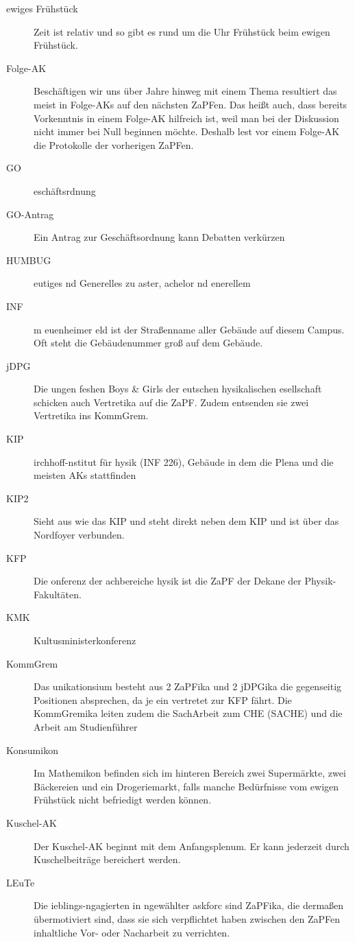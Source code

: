 \begin{description}
	\item[ewiges Frühstück] Zeit ist relativ und so gibt es rund um die Uhr Frühstück beim ewigen Frühstück.
	\item[Folge-AK] Beschäftigen wir uns über Jahre hinweg mit einem Thema resultiert das meist in Folge-AKs auf den nächsten ZaPFen. Das heißt auch, dass bereits Vorkenntnis in einem Folge-AK hilfreich ist, weil man bei der Diskussion nicht immer bei Null beginnen möchte. Deshalb lest vor einem Folge-AK die Protokolle der vorherigen ZaPFen.
	\item[GO] eschäftsrdnung
	\item[GO-Antrag] Ein Antrag zur Geschäftsordnung kann Debatten verkürzen
	\item[HUMBUG] eutiges nd Generelles zu aster, achelor nd enerellem
	\item[INF] m euenheimer eld ist der Straßenname aller Gebäude auf diesem Campus. Oft steht die Gebäudenummer groß auf dem Gebäude.
	\item[jDPG] Die ungen feshen Boys \& Girls der eutschen hysikalischen esellschaft schicken auch Vertretika auf die ZaPF. Zudem entsenden sie zwei Vertretika ins KommGrem.
	\item[KIP] irchhoff-nstitut für hysik (INF 226), Gebäude in dem die Plena und die meisten AKs stattfinden 
	\item[KIP2] Sieht aus wie das KIP und steht direkt neben dem KIP und ist über das Nordfoyer verbunden.
	\item[KFP] Die onferenz der achbereiche hysik ist die ZaPF der Dekane der Physik-Fakultäten.
	\item[KMK] Kultusministerkonferenz
	\item[KommGrem] Das unikationsium besteht aus 2 ZaPFika und 2 jDPGika die gegenseitig Positionen absprechen, da je ein vertretet zur KFP fährt. Die KommGremika leiten zudem die SachArbeit zum CHE (SACHE) und die Arbeit am Studienführer
	\item[Konsumikon] Im Mathemikon befinden sich im hinteren Bereich zwei Supermärkte, zwei Bäckereien und ein Drogeriemarkt, falls manche Bedürfnisse vom ewigen Frühstück nicht befriedigt werden können.
	\item[Kuschel-AK] Der Kuschel-AK beginnt mit dem Anfangsplenum. Er kann jederzeit durch Kuschelbeiträge bereichert werden.
	\item[LEuTe] Die ieblings-ngagierten in ngewählter askforc sind ZaPFika, die dermaßen übermotiviert sind, dass sie sich verpflichtet haben zwischen den ZaPFen inhaltliche Vor- oder Nacharbeit zu verrichten.

\end{description}
